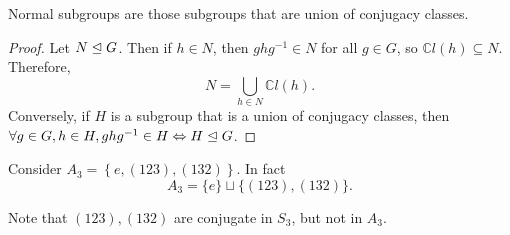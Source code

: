 \documentclass[a4paper]{article}
\begin{document}
      \begin{proposition}\label{prop:5.23}
          Normal subgroups are those subgroups that are union of conjugacy classes.
      \end{proposition}
      \begin{proof}
          Let $ N \trianglelefteq G $. Then if $ h\in N $, then $ghg^{-1}\in N$ for all $g\in G$, so $ \mathbb{C}l(h) \subseteq N $. Therefore, 
          \[
              N=\bigcup_{h\in N} \mathbb{C}l(h)
          .\]
          Conversely, if $H$ is a subgroup that is a union of conjugacy classes, then $ \forall g\in G, h\in H, ghg^{-1}\in H \Leftrightarrow H \trianglelefteq G $.
      \end{proof}
      \begin{example}
          Consider $ A_3=\left\{ e,(123),(132) \right\} $. In fact 
          \[
              A_3 = \{e\}\sqcup \{(123),(132)\}
          .\]
      \end{example}
      \begin{remark}
          Note that $ (123),(132) $ are conjugate in $S_3$, but not in $A_3$.
      \end{remark}
\end{document}
